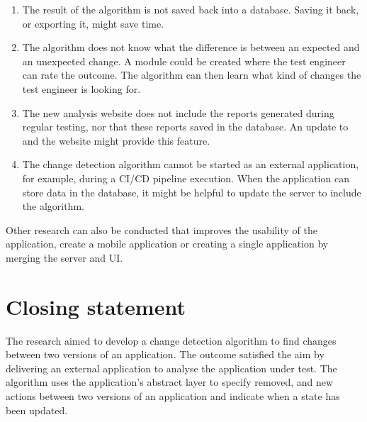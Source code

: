 \begin{enumerate}
\item The result of the algorithm is not saved back into a database. Saving it back, or exporting it, might save time. 

\item The algorithm does not know what the difference is between an expected and an unexpected change. A module could be created where the test engineer can rate the outcome. The algorithm can then learn what kind of changes the test engineer is looking for. 

\item The new analysis website does not include the \testar reports generated during regular testing, nor that these reports saved in the database. An update to \testar and the website might provide this feature.

\item The change detection algorithm cannot be started as an external application, for example, during a CI/CD pipeline execution. When the application can store data in the database, it might be helpful to update the \dotnet server to include the algorithm. 

\end{enumerate}

Other research can also be conducted that improves the usability of the application, create a mobile application or creating a single application by merging the \dotnet server and UI. 

\section{Closing statement}
The research aimed to develop a change detection algorithm to find changes between two versions of an application. The outcome satisfied the aim by delivering an external application to analyse the application under test. The algorithm uses the application's abstract layer to specify removed, and new actions between two versions of an application and indicate when a state has been updated. 

